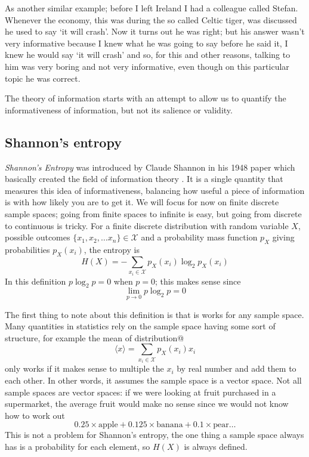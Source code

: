 \documentclass[12pt]{article}
\begin{document}
As another similar example; before I left Ireland I had a colleague
called Stefan. Whenever the economy, this was during the so called
Celtic tiger, was discussed he used to say \lq{}it will
crash\rq{}. Now it turns out he was right; but his answer wasn't very
informative because I knew what he was going to say before he said it,
I knew he would say \lq{}it will crash\rq{} and so, for this and other
reasons, talking to him was very boring and not very informative, even
though on this particular topic he was correct.

The theory of information starts with an attempt to allow us to
quantify the informativeness of information, but not its salience or
validity.

\subsection*{Shannon's entropy}


\textsl{Shannon's Entropy} was introduced by Claude Shannon in his
1948 paper which basically created the field of information theory
\citep{Shannon1948}. It is a single quantity that measures this idea of
informativeness, balancing how useful a piece of information is with
how likely you are to get it. We will focus for now on finite discrete
sample spaces; going from finite spaces to infinite is easy, but going
from discrete to continuous is tricky. For a finite discrete
distribution with random variable $X$, possible outcomes
$\{x_1,x_2,\ldots x_n\}\in\mathcal{X}$ and a probability mass function
$p_X$ giving probabilities $p_X(x_i)$, the entropy is
\begin{equation}
H(X)=-\sum_{x_i\in \mathcal{X}}{p_X(x_i)\log_2p_X(x_i)}
\end{equation}
In this definition $p\log_2{p}=0$ when $p=0$; this makes sense since
\begin{equation}
\lim_{p\rightarrow 0}p\log_2{p}=0
\end{equation}


The first thing to note about this definition is that is works for any
sample space. Many quantities in statistics rely on the sample space
having some sort of structure, for example the mean of distribution@
\begin{equation}
\langle x\rangle = \sum_{x_i\in \mathcal{X}}{p_X(x_i)x_i}
\end{equation}
only works if it makes sense to multiple the $x_i$ by real number and
add them to each other. In other words, it assumes the sample space is
a vector space. Not all sample spaces are vector spaces: if we were
looking at fruit purchased in a supermarket, the average fruit would
make no sense since we would not know how to work out
\begin{equation}
0.25\times \mbox{apple}+0.125\times \mbox{banana}+0.1\times \mbox{pear}\ldots
\end{equation}
This is not a problem for Shannon's entropy, the one
thing a sample space always has is a probability for each element, so
$H(X)$ is always defined.
\end{document}
